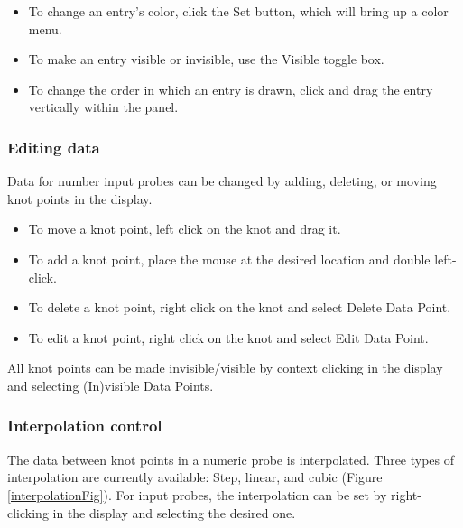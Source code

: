 \documentclass{article}
\begin{document}
\begin{itemize}

\item To change an entry's color, click the {\sf Set} button, which
will bring up a color menu.

\item To make an entry visible or invisible, use the {\sf Visible}
toggle box.

\item To change the order in which an entry is drawn, click and drag the
entry vertically within the panel.

\end{itemize}

\subsubsection{Editing data}

Data for number input probes can be changed by adding, deleting, or
moving knot points in the display.

\begin{itemize}

\item To move a knot point, left click on the knot and drag it.

\item To add a knot point, place the mouse at the desired location
and double left-click.

\item To delete a knot point, right click on the knot and select 
{\sf Delete Data Point}.

\item To edit a knot point, right click on the knot and select 
{\sf Edit Data Point}.

\end{itemize}

All knot points can be made invisible/visible by context clicking in the 
display and selecting {\sf (In)visible Data Points}.

\subsubsection{Interpolation control}

The data between knot points in a numeric probe is interpolated.
Three types of interpolation are currently available: Step, linear,
and cubic (Figure \ref{interpolationFig}). For input probes, the interpolation
can be set by right-clicking in the display and selecting the desired
one.
\end{document}
